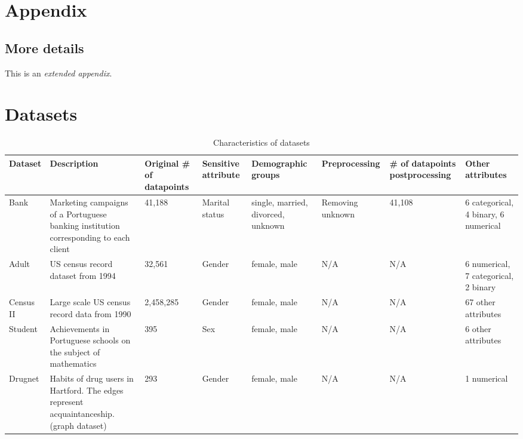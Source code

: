 \newpage
\section*{Appendix}
\subsection{More details}
This is an \textit{extended appendix}.



\section{Datasets}\label{appendix:datasets}

\begin{table}[H]
	\scriptsize
	\centering
	\begin{tabular}{|m{.7cm}|m{1.7cm}|m{1.2cm}|m{.9cm}|m{1.3cm}|m{1.3cm}|m{1.3cm}|m{1.4cm}|}
	\hline
    Dataset   & Description                                                                                & Original \# of datapoints  & Sensitive attribute & Demographic groups                  & Preprocessing    & \# of datapoints postprocessing & Other attributes                     \\ \hline
	Bank      & Marketing campaigns of a Portuguese banking institution corresponding to each client       & 41,188                     & Marital status      & single, married, divorced, unknown  & Removing unknown & 41,108                          & 6 categorical, 4 binary, 6 numerical \\ \hline
	Adult     & US census record dataset from 1994                                                         & 32,561                     & Gender              & female, male                        & N/A              & N/A                             & 6 numerical, 7 categorical, 2 binary \\ \hline
	Census II & Large scale US census record data from 1990                                                & 2,458,285                  & Gender              & female, male                        & N/A              & N/A                             & 67 other attributes                  \\ \hline
	Student   & Achievements in Portuguese schools on the subject of mathematics                           & 395                        & Sex                 & female, male                        & N/A              & N/A                             & 6 other attributes                   \\ \hline
	Drugnet   & Habits of drug users in Hartford. The edges represent acquaintanceship. (graph dataset)    & 293                        & Gender              & female, male                        & N/A              & N/A                             & 1 numerical                          \\ \hline
	\end{tabular}
	\caption{Characteristics of datasets}
	\label{tab:datasetreprod}
\end{table}



